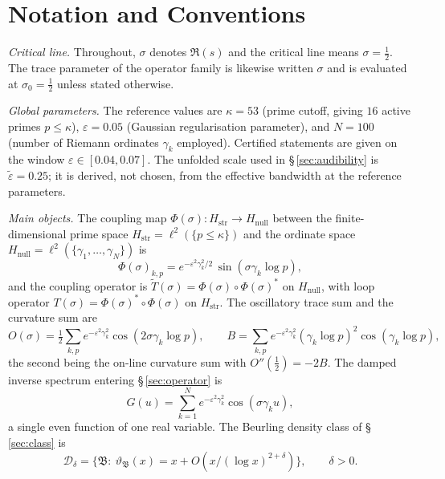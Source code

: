 \documentclass[11pt]{article}
\newcommand{\Hstr}{H_{\mathrm{str}}}
\newcommand{\Hnull}{H_{\mathrm{null}}}
\newcommand{\Tt}{\widetilde{T}}
\newcommand{\Dclass}{\mathcal{D}_\delta}        %
\begin{document}
\section*{Notation and Conventions}
\label{sec:notation}

\emph{Critical line.}
Throughout, $\sigma$ denotes $\Re(s)$ and the critical line means
$\sigma=\tfrac12$. The trace parameter of the operator family is likewise
written $\sigma$ and is evaluated at $\sigma_0=\tfrac12$ unless stated
otherwise.

\medskip
\emph{Global parameters.}
The reference values are $\kappa=53$ (prime cutoff, giving $16$ active primes
$p\le\kappa$), $\varepsilon=0.05$ (Gaussian regularisation parameter), and
$N=100$ (number of Riemann ordinates $\gamma_k$ employed). Certified
statements are given on the window $\varepsilon\in[0.04,0.07]$. The unfolded
scale used in \S\,\ref{sec:audibility} is $\tilde\varepsilon=0.25$; it is
derived, not chosen, from the effective bandwidth at the reference parameters.

\medskip
\emph{Main objects.}
The coupling map $\Phi(\sigma):\Hstr\to\Hnull$ between the finite-dimensional
prime space $\Hstr=\ell^2(\{p\le\kappa\})$ and the ordinate space
$\Hnull=\ell^2(\{\gamma_1,\dots,\gamma_N\})$ is
\[
\Phi(\sigma)_{k,p}=e^{-\varepsilon^2\gamma_k^2/2}\,\sin(\sigma\gamma_k\log p),
\]
and the coupling operator is $\Tt(\sigma)=\Phi(\sigma)\circ\Phi(\sigma)^*$ on
$\Hnull$, with loop operator $T(\sigma)=\Phi(\sigma)^*\circ\Phi(\sigma)$ on
$\Hstr$. The oscillatory trace sum and the curvature sum are
\[
O(\sigma)=\tfrac12\sum_{k,p}e^{-\varepsilon^2\gamma_k^2}
          \cos(2\sigma\gamma_k\log p),
\qquad
B=\sum_{k,p}e^{-\varepsilon^2\gamma_k^2}(\gamma_k\log p)^2
  \cos(\gamma_k\log p),
\]
the second being the on-line curvature sum with $O''(\tfrac12)=-2B$. The
damped inverse spectrum entering \S\,\ref{sec:operator} is
\[
G(u)=\sum_{k=1}^{N}e^{-\varepsilon^2\gamma_k^2}\cos(\sigma\gamma_k u),
\]
a single even function of one real variable. The Beurling density class of
\S\,\ref{sec:class} is
\[
\Dclass=\{\mathfrak{B}:\ \vartheta_{\mathfrak{B}}(x)=x+O(x/(\log x)^{2+\delta})\},
\qquad\delta>0.
\]
\end{document}
